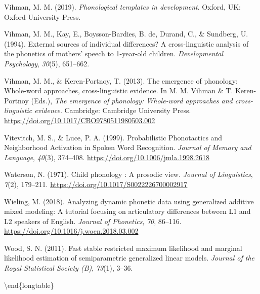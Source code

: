\documentclass[
  man]{apa6}
\newlength{\cslhangindent}
\newlength{\cslentryspacingunit} %
\newenvironment{CSLReferences}[2] %
 {%
  \setlength{\parindent}{0pt}
  \ifodd #1
  \let\oldpar\par
  \def\par{\hangindent=\cslhangindent\oldpar}
  \fi
  \setlength{\parskip}{#2\cslentryspacingunit}
 }%
 {}
\begin{document}
\begin{CSLReferences}{1}{0}
\leavevmode{}%
Vihman, M. M. (2019). \emph{Phonological templates in development}. Oxford, {UK}: Oxford University Press.

\leavevmode{}%
Vihman, M. M., Kay, E., Boysson-Bardies, B. de, Durand, C., \& Sundberg, U. (1994). External sources of individual differences? A cross-linguistic analysis of the phonetics of mothers' speech to 1-year-old children. \emph{Developmental Psychology}, \emph{30}(5), 651--662.

\leavevmode{}%
Vihman, M. M., \& Keren-Portnoy, T. (2013). The emergence of phonology: Whole-word approaches, cross-linguistic evidence. In M. M. Vihman \& T. Keren-Portnoy (Eds.), \emph{The emergence of phonology: Whole-word approaches and cross-linguistic evidence}. Cambridge: Cambridge University Press. \url{https://doi.org/10.1017/CBO9780511980503.002}

\leavevmode{}%
Vitevitch, M. S., \& Luce, P. A. (1999). Probabilistic {Phonotactics} and {Neighborhood} {Activation} in {Spoken} {Word} {Recognition}. \emph{Journal of Memory and Language}, \emph{40}(3), 374--408. \url{https://doi.org/10.1006/jmla.1998.2618}

\leavevmode{}%
Waterson, N. (1971). Child phonology : A prosodic view. \emph{Journal of Linguistics}, \emph{7}(2), 179--211. \url{https://doi.org/10.1017/S0022226700002917}

\leavevmode{}%
Wieling, M. (2018). Analyzing dynamic phonetic data using generalized additive mixed modeling: {A} tutorial focusing on articulatory differences between {L1} and {L2} speakers of {English}. \emph{Journal of Phonetics}, \emph{70}, 86--116. \url{https://doi.org/10.1016/j.wocn.2018.03.002}

\leavevmode{}%
Wood, S. N. (2011). Fast stable restricted maximum likelihood and marginal likelihood estimation of semiparametric generalized linear models. \emph{Journal of the Royal Statistical Society (B)}, \emph{73}(1), 3--36.

\end{CSLReferences}

\textbackslash end\{longtable\}
\endgroup


\clearpage
\renewcommand{\listfigurename}{Figure captions}
\end{document}
